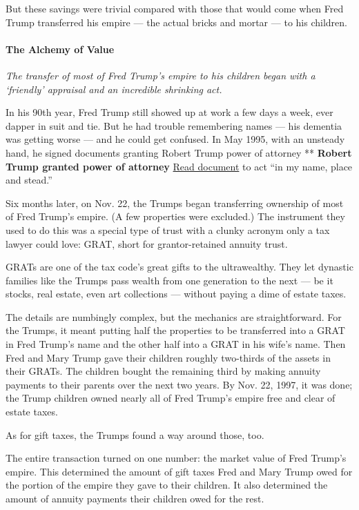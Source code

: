 But these savings were trivial compared with those that would come when
Fred Trump transferred his empire --- the actual bricks and mortar ---
to his children.

\hypertarget{the-alchemy-of-value}{%
\paragraph{The Alchemy of Value}\label{the-alchemy-of-value}}

\emph{The transfer of most of Fred Trump's empire to his children began
with a `friendly' appraisal and an incredible shrinking act.}

In his 90th year, Fred Trump still showed up at work a few days a week,
ever dapper in suit and tie. But he had trouble remembering names ---
his dementia was getting worse --- and he could get confused. In May
1995, with an unsteady hand, he signed documents granting Robert Trump
power of attorney ** \textbf{Robert Trump granted power of attorney}
\href{https://int.nyt.com/data/documenthelper/140-1995-power-of-attorney/76fe49efb6b1ae8eabe3/optimized/full.pdf\#page=1}{Read
document} to act ``in my name, place and stead.''

Six months later, on Nov. 22, the Trumps began transferring ownership of
most of Fred Trump's empire. (A few properties were excluded.) The
instrument they used to do this was a special type of trust with a
clunky acronym only a tax lawyer could love: GRAT, short for
grantor-retained annuity trust.

GRATs are one of the tax code's great gifts to the ultrawealthy. They
let dynastic families like the Trumps pass wealth from one generation to
the next --- be it stocks, real estate, even art collections --- without
paying a dime of estate taxes.

The details are numbingly complex, but the mechanics are
straightforward. For the Trumps, it meant putting half the properties to
be transferred into a GRAT in Fred Trump's name and the other half into
a GRAT in his wife's name. Then Fred and Mary Trump gave their children
roughly two-thirds of the assets in their GRATs. The children bought the
remaining third by making annuity payments to their parents over the
next two years. By Nov. 22, 1997, it was done; the Trump children owned
nearly all of Fred Trump's empire free and clear of estate taxes.

As for gift taxes, the Trumps found a way around those, too.

The entire transaction turned on one number: the market value of Fred
Trump's empire. This determined the amount of gift taxes Fred and Mary
Trump owed for the portion of the empire they gave to their children. It
also determined the amount of annuity payments their children owed for
the rest.

